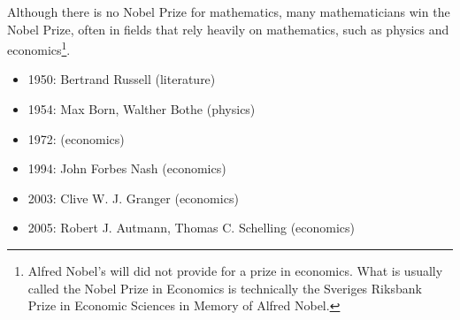 \documentclass[12pt]{article}
\begin{document}

Although there is no Nobel Prize for mathematics, many mathematicians win the Nobel Prize, often in fields that rely heavily on mathematics, such as physics and economics\footnote{Alfred Nobel's will did not provide for a prize in economics.  What is usually called the Nobel Prize in Economics is technically the Sveriges Riksbank Prize in Economic Sciences in Memory of Alfred Nobel.}.

\begin{itemize}
\item
1950: Bertrand Russell (literature)

\item
1954: Max Born, Walther Bothe (physics)

\item
1972:  (economics)

\item
1994: John Forbes Nash (economics)

\item
2003: Clive W. J. Granger (economics)

\item
2005: Robert J. Autmann, Thomas C. Schelling (economics) 
\end{itemize}
\end{document}
